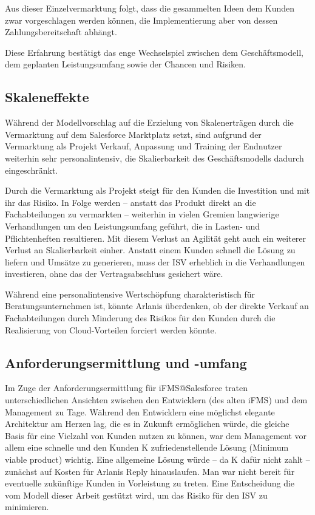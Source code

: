 Aus dieser Einzelvermarktung folgt, dass die gesammelten Ideen dem Kunden zwar 
vorgeschlagen werden können, die Implementierung aber von dessen 
Zahlungsbereitschaft abhängt.

Diese Erfahrung bestätigt das enge Wechselspiel zwischen dem Geschäftsmodell, 
dem geplanten Leistungsumfang sowie der Chancen und Risiken.

\subsection{Skaleneffekte}
Während der Modellvorschlag auf die Erzielung von Skalenerträgen durch die 
Vermarktung auf dem Salesforce Marktplatz setzt, sind aufgrund der Vermarktung 
als Projekt Verkauf, Anpassung und Training der Endnutzer weiterhin sehr 
personalintensiv, die Skalierbarkeit des Geschäftsmodells dadurch 
eingeschränkt. 

Durch die Vermarktung als Projekt steigt für den Kunden die Investition und mit 
ihr das Risiko. In Folge werden -- anstatt das Produkt direkt an die 
Fachabteilungen zu vermarkten -- weiterhin in vielen Gremien langwierige 
Verhandlungen um den Leistungsumfang geführt, die in Lasten- und Pflichtenheften 
resultieren. Mit diesem Verlust an Agilität geht auch ein weiterer Verlust an 
Skalierbarkeit einher. Anstatt einem Kunden schnell die Lösung zu liefern und 
Umsätze zu generieren, muss der ISV erheblich in die Verhandlungen investieren, 
ohne das der Vertragsabschluss gesichert wäre.

Während eine personalintensive Wertschöpfung charakteristisch für 
Beratungsunternehmen ist, könnte Arlanis überdenken, ob der direkte Verkauf an 
Fachabteilungen durch Minderung des Risikos für den Kunden durch die 
Realisierung von Cloud-Vorteilen forciert werden könnte. 

\subsection{Anforderungsermittlung und -umfang}
Im Zuge der Anforderungsermittlung für iFMS@Salesforce traten 
unterschiedlichen Ansichten zwischen den Entwicklern (des alten iFMS) und 
dem Management zu Tage. Während den Entwicklern eine möglichst elegante 
Architektur am Herzen lag, die es in Zukunft ermöglichen würde, die gleiche 
Basis für eine Vielzahl von Kunden nutzen zu können, war dem Management vor 
allem eine schnelle und den Kunden K zufriedenstellende Lösung (Minimum viable 
product) wichtig. Eine allgemeine Lösung würde -- da K dafür nicht zahlt -- 
zunächst auf Kosten für Arlanis Reply hinauslaufen. Man war nicht bereit für 
eventuelle zukünftige Kunden in Vorleistung zu treten. Eine Entscheidung die vom 
Modell dieser Arbeit gestützt wird, um das Risiko für den ISV zu minimieren.

